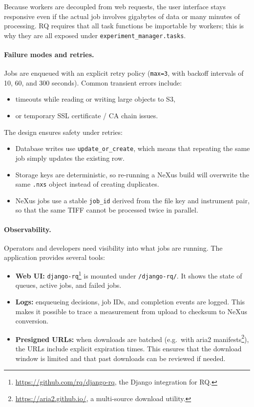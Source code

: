 Because workers are decoupled from web requests, the user interface stays responsive 
even if the actual job involves gigabytes of data or many minutes of processing.  
RQ requires that all task functions be importable by workers; this is why they are all exposed under 
\texttt{experiment\_manager.tasks}.

\paragraph{Failure modes and retries.}
Jobs are enqueued with an explicit retry policy (\texttt{max=3}, with backoff intervals of 10, 60, and 300 seconds).  
Common transient errors include:  
\begin{itemize}
	\item timeouts while reading or writing large objects to S3,  
	\item or temporary SSL certificate / CA chain issues.  
\end{itemize}

The design ensures safety under retries:  
\begin{itemize}
	\item Database writes use \texttt{update\_or\_create}, which means that repeating the same job simply updates the existing row.  
	\item Storage keys are deterministic, so re-running a NeXus build will overwrite the same \texttt{.nxs} object instead of creating duplicates.  
	\item NeXus jobs use a stable \texttt{job\_id} derived from the file key and instrument pair, 
	so that the same TIFF cannot be processed twice in parallel.  
\end{itemize}

\paragraph{Observability.}
Operators and developers need visibility into what jobs are running.  
The application provides several tools:  
\begin{itemize}
	\item \textbf{Web UI:} \texttt{django-rq}\footnote{\url{https://github.com/rq/django-rq}, the Django integration for RQ.} 
	is mounted under \texttt{/django-rq/}. It shows the state of queues, active jobs, and failed jobs.  
	\item \textbf{Logs:} enqueueing decisions, job IDs, and completion events are logged.  
	This makes it possible to trace a measurement from upload to checksum to NeXus conversion.  
	\item \textbf{Presigned URLs:} when downloads are batched (e.g.\ with aria2 manifests\footnote{\url{https://aria2.github.io/}, a multi-source download utility.}), 
	the URLs include explicit expiration times.
	This ensures that the download window is limited and that past downloads can be reviewed if needed.  
\end{itemize}

